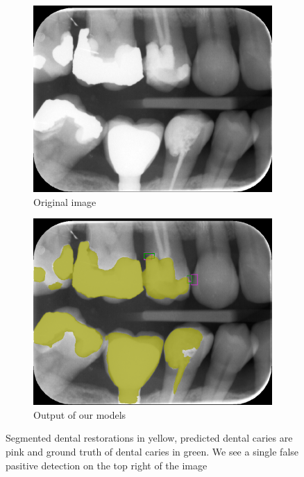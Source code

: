\begin{figure}[h]
    \centering
    \begin{subfigure}[b]{0.9\textwidth}
        \includegraphics[width=1\linewidth]{images/det2orig.png}
        \caption{Original image}
    \end{subfigure}
    \begin{subfigure}[b]{0.9\textwidth}
        \includegraphics[width=1\linewidth]{images/det2pred.png}
        \caption{Output of our models}
    \end{subfigure}
    \caption{ Segmented dental restorations in yellow, predicted dental caries are pink and ground truth of dental caries in green. We see a single false pasitive detection on the top right of the image}
    \label{}
\end{figure}


